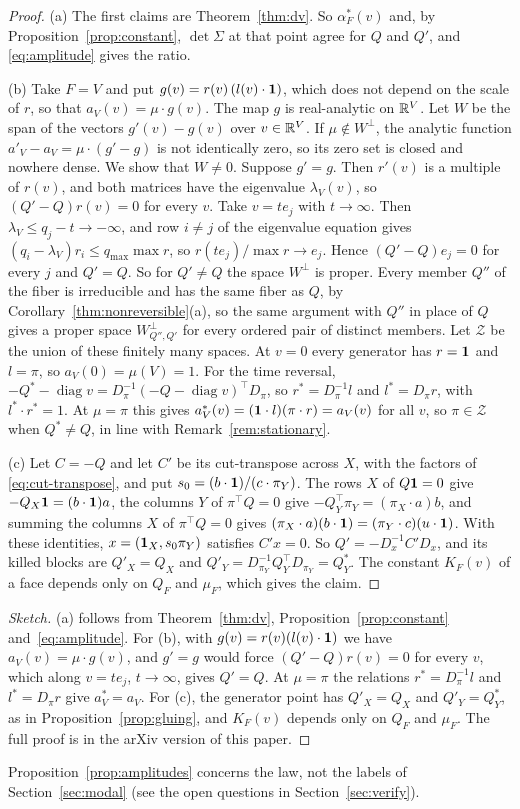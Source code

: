 \ifarxivbuild
\begin{proof}
(a) The first claims are Theorem~\ref{thm:dv}. So $\alpha^*_F(v)$ and, by
Proposition~\ref{prop:constant}, $\det\Sigma$ at that point agree for $Q$ and $Q'$, and
\eqref{eq:amplitude} gives the ratio.

(b) Take $F=V$ and put $g(v)=r(v)\,(l(v)\cdot\mathbf{1})$, which does not depend on the scale of
$r$, so that $a_V(v)=\mu\cdot g(v)$. The map $g$ is real-analytic on $\mathbb{R}^V$. Let $W$ be the
span of the vectors $g'(v)-g(v)$ over $v\in\mathbb{R}^V$. If $\mu\notin W^\perp$, the analytic
function $a'_V-a_V=\mu\cdot(g'-g)$ is not identically zero, so its zero set is closed and
nowhere dense. We show that $W\ne0$. Suppose $g'=g$. Then $r'(v)$ is a multiple of $r(v)$,
and both matrices have the eigenvalue $\lambda_V(v)$, so $(Q'-Q)r(v)=0$ for every $v$. Take
$v=te_j$ with $t\to\infty$. Then $\lambda_V\le q_j-t\to-\infty$, and row $i\ne j$ of the
eigenvalue equation gives $(q_i-\lambda_V)r_i\le q_{\max}\max r$, so $r(te_j)/\max r\to e_j$.
Hence $(Q'-Q)e_j=0$ for every $j$ and $Q'=Q$. So for $Q'\ne Q$ the space $W^\perp$ is proper.
Every member $Q''$ of the fiber is irreducible and has the same fiber as $Q$, by
Corollary~\ref{thm:nonreversible}(a), so the same argument with $Q''$ in place of $Q$ gives a
proper space $W^\perp_{Q'',Q'}$ for every ordered pair of distinct members. Let $\mathcal Z$ be
the union of these finitely many spaces.
At $v=0$ every generator has $r=\mathbf{1}$ and $l=\pi$, so $a_V(0)=\mu(V)=1$. For the time
reversal, $-Q^*-\operatorname{diag}v=D_\pi^{-1}(-Q-\operatorname{diag}v)^\top D_\pi$, so
$r^*=D_\pi^{-1}l$ and $l^*=D_\pi r$, with $l^*\cdot r^*=1$. At $\mu=\pi$ this gives
$a^*_V(v)=(\mathbf{1}\cdot l)(\pi\cdot r)=a_V(v)$ for all $v$, so $\pi\in\mathcal Z$ when
$Q^*\ne Q$, in line with Remark~\ref{rem:stationary}.

(c) Let $C=-Q$ and let $C'$ be its cut-transpose across $X$, with the factors of
\eqref{eq:cut-transpose}, and put $s_0=(b\cdot\mathbf{1})/(c\cdot\pi_Y)$. The rows $X$ of
$Q\mathbf{1}=0$ give $-Q_X\mathbf{1}=(b\cdot\mathbf{1})a$, the columns $Y$ of $\pi^\top Q=0$ give
$-Q_Y^\top\pi_Y=(\pi_X\cdot a)b$, and summing the columns $X$ of $\pi^\top Q=0$ gives
$(\pi_X\cdot a)(b\cdot\mathbf{1})=(\pi_Y\cdot c)(u\cdot\mathbf{1})$. With these identities,
$x=(\mathbf{1}_X,s_0\pi_Y)$ satisfies $C'x=0$. So $Q'=-D_x^{-1}C'D_x$, and its killed blocks are
$Q'_X=Q_X$ and $Q'_Y=D_{\pi_Y}^{-1}Q_Y^\top D_{\pi_Y}=Q^*_Y$. The constant $K_F(v)$ of a face
depends only on $Q_F$ and $\mu_F$, which gives the claim.
\end{proof}
\else
\begin{proof}[Sketch]
(a) follows from Theorem~\ref{thm:dv}, Proposition~\ref{prop:constant} and~\eqref{eq:amplitude}.
For (b), with $g(v)=r(v)(l(v)\cdot\mathbf{1})$ we have $a_V(v)=\mu\cdot g(v)$, and $g'=g$ would force
$(Q'-Q)r(v)=0$ for every $v$, which along $v=te_j$, $t\to\infty$, gives $Q'=Q$. At $\mu=\pi$ the
relations $r^*=D_\pi^{-1}l$ and $l^*=D_\pi r$ give $a^*_V=a_V$. For (c), the generator point has
$Q'_X=Q_X$ and $Q'_Y=Q^*_Y$, as in Proposition~\ref{prop:gluing}, and $K_F(v)$ depends only on
$Q_F$ and $\mu_F$. The full proof is in the arXiv version of this paper.
\end{proof}
\fi

Proposition~\ref{prop:amplitudes} concerns the law, not the labels of
Section~\ref{sec:modal} (see the open questions in Section~\ref{sec:verify}).
